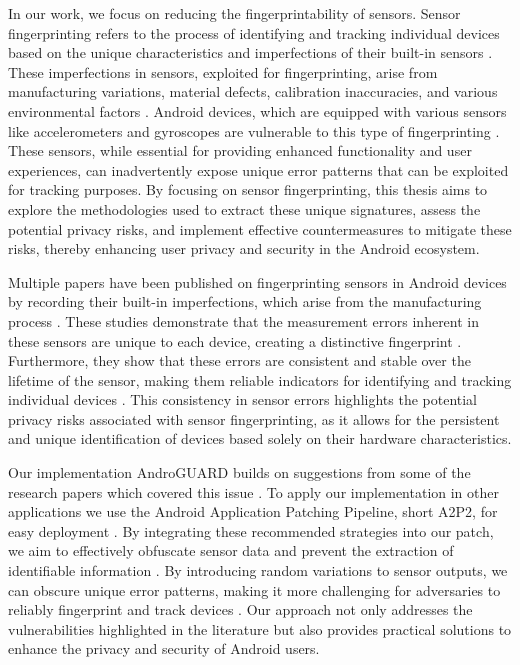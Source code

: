 \documentclass[11pt,
  oneside,openany,    %
]{scrreprt}
\begin{document}
In our work, we focus on reducing the fingerprintability of sensors.
Sensor fingerprinting refers to the process of identifying and tracking individual devices based on the unique characteristics and imperfections of their built-in sensors \cite{bojinov2014mobile, dey2014accelprint, casarez2021sensor}. 
These imperfections in sensors, exploited for fingerprinting, arise from manufacturing variations, material defects, calibration inaccuracies, and various environmental factors \cite{baldini2017survey, das2018every, zhang2020factory}. 
Android devices, which are equipped with various sensors like accelerometers and gyroscopes are vulnerable to this type of fingerprinting \cite{das2016tracking}. 
These sensors, while essential for providing enhanced functionality and user experiences, can inadvertently expose unique error patterns that can be exploited for tracking purposes. 
By focusing on sensor fingerprinting, this thesis aims to explore the methodologies used to extract these unique signatures, assess the potential privacy risks, and implement effective countermeasures to mitigate these risks, thereby enhancing user privacy and security in the Android ecosystem.

Multiple papers have been published on fingerprinting sensors in Android devices by recording their built-in imperfections, which arise from the manufacturing process \cite{das2014poster}. 
These studies demonstrate that the measurement errors inherent in these sensors are unique to each device, creating a distinctive fingerprint \cite{sensor-js-2018, amerini2017smartphone}. 
Furthermore, they show that these errors are consistent and stable over the lifetime of the sensor, making them reliable indicators for identifying and tracking individual devices \cite{bojinov2014mobile}. 
This consistency in sensor errors highlights the potential privacy risks associated with sensor fingerprinting, as it allows for the persistent and unique identification of devices based solely on their hardware characteristics.

Our implementation AndroGUARD builds on suggestions from some of the research papers which covered this issue \cite{das2016tracking, amerini2017smartphone, sensor-js-2018, das2015exploring}. 
To apply our implementation in other applications we use the Android Application Patching Pipeline, short A2P2, for easy deployment \cite{draschbacher2023a2p2}.
By integrating these recommended strategies into our patch, we aim to effectively obfuscate sensor data and prevent the extraction of identifiable information \cite{das2015exploring, das2016tracking, amerini2017smartphone}. 
By introducing random variations to sensor outputs, we can obscure unique error patterns, making it more challenging for adversaries to reliably fingerprint and track devices \cite{das2016tracking, amerini2017smartphone}. 
Our approach not only addresses the vulnerabilities highlighted in the literature but also provides practical solutions to enhance the privacy and security of Android users.
\end{document}
